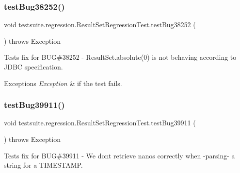 \subsubsection{\texorpdfstring{test\+Bug38252()}{testBug38252()}}
{\footnotesize\ttfamily void testsuite.\+regression.\+Result\+Set\+Regression\+Test.\+test\+Bug38252 (\begin{DoxyParamCaption}{ }\end{DoxyParamCaption}) throws Exception}

Tests fix for B\+UG\#38252 -\/ Result\+Set.\+absolute(0) is not behaving according to J\+D\+BC specification.


\begin{DoxyExceptions}{Exceptions}
{\em Exception} & if the test fails. \\
\hline
\end{DoxyExceptions}
\mbox{\label{classtestsuite_1_1regression_1_1_result_set_regression_test_ac36269358f8d90ebeebaf8a8434ba03a}} 
\subsubsection{\texorpdfstring{test\+Bug39911()}{testBug39911()}}
{\footnotesize\ttfamily void testsuite.\+regression.\+Result\+Set\+Regression\+Test.\+test\+Bug39911 (\begin{DoxyParamCaption}{ }\end{DoxyParamCaption}) throws Exception}

Tests fix for B\+UG\#39911 -\/ We don\textquotesingle{}t retrieve nanos correctly when -\/parsing-\/ a string for a T\+I\+M\+E\+S\+T\+A\+MP. \mbox{\label{classtestsuite_1_1regression_1_1_result_set_regression_test_a80a9d333e89511f5233ebc8c8d2fd4b6}} 
